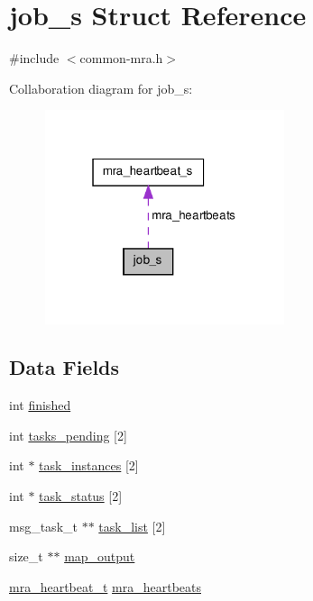 \hypertarget{structjob__s}{\section{job\-\_\-s \-Struct \-Reference}
\label{structjob__s}
}


{\ttfamily \#include $<$common-\/mra.\-h$>$}



\-Collaboration diagram for job\-\_\-s\-:\nopagebreak
\begin{figure}[H]
\begin{center}
\leavevmode
\includegraphics[width=199pt]{structjob__s__coll__graph}
\end{center}
\end{figure}
\subsection*{\-Data \-Fields}
\begin{DoxyCompactItemize}
\item 
int \hyperlink{structjob__s_ab8937d6bc68b0fc735d85461886a5d81}{finished}
\item 
int \hyperlink{structjob__s_a2121f93a58679fe228efdefe7bdcd1ba}{tasks\-\_\-pending} \mbox{[}2\mbox{]}
\item 
int $\ast$ \hyperlink{structjob__s_a511f43e33a73ddbda1ec080c2f972e33}{task\-\_\-instances} \mbox{[}2\mbox{]}
\item 
int $\ast$ \hyperlink{structjob__s_a25c05f7bc2c55b8626a947c42fbea207}{task\-\_\-status} \mbox{[}2\mbox{]}
\item 
msg\-\_\-task\-\_\-t $\ast$$\ast$ \hyperlink{structjob__s_a30c1a20fc86906cb521672940ff65c0f}{task\-\_\-list} \mbox{[}2\mbox{]}
\item 
size\-\_\-t $\ast$$\ast$ \hyperlink{structjob__s_aaf7015affb185128aab0ad5420310c74}{map\-\_\-output}
\item 
\hyperlink{common-mra_8h_a9a9d834f744f36f4e51ebf6c532e26bd}{mra\-\_\-heartbeat\-\_\-t} \hyperlink{structjob__s_a7e379eed44e91688e48a9ff5ff5a12c9}{mra\-\_\-heartbeats}
\end{DoxyCompactItemize}



